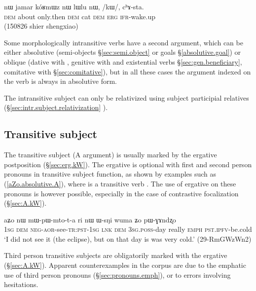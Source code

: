 \begin{exe}
\ex \label{ex:kW.chAsta}
 \gll nɯ jamar kóʁmɯz nɯ lɯlu nɯ, /kɯ/, cʰɤ-sta. \\
 \textsc{dem} about only.then \textsc{dem} cat \textsc{dem} \textsc{erg} \textsc{ifr}-wake.up \\
 \glt (150826 shier shengxiao)
\end{exe}

Some morphologically intransitive verbs have a second argument, which can be either absolutive (semi-objects §\ref{sec:semi.object} or goals §\ref{absolutive.goal}) or oblique (dative with , genitive with  and existential verbs §\ref{sec:gen.beneficiary},  comitative with  §\ref{sec:comitative}), but in all these cases the argument indexed on the verb is always in absolutive form. 

The intransitive subject can only be relativized using subject participial relatives (§\ref{sec:intr.subject.relativization} ).

\subsection{Transitive subject} \label{sec:absolutive.A}
 
The transitive subject (A argument) is usually marked by the ergative postposition  (§\ref{sec:erg.kW}). The ergative is optional with first and second person pronouns in transitive subject function, as shown by examples such as (\ref{aZo.absolutive.A}), where  is a transitive verb . The use of ergative on these pronouns is however possible, especially in the case of contrastive focalization (§\ref{sec:A.kW}).


\begin{exe}
\ex \label{aZo.absolutive.A}
 \gll aʑo nɯ mɯ-pɯ-mto-t-a ri nɯ ɯ-sŋi wuma ʑo pɯ-ɣɤndʐo \\
\textsc{1sg} \textsc{dem} \textsc{neg}-\textsc{aor}-see-\textsc{tr}:\textsc{pst}-\textsc{1sg} \textsc{lnk} \textsc{dem} \textsc{3sg}.\textsc{poss}-day really \textsc{emph} \textsc{pst}.\textsc{ipfv}-be.cold  \\
 \glt `I did not see it (the eclipse), but on that day is was very cold.' (29-RmGWzWn2)
\end{exe}

Third person transitive subjects are obligatorily marked with the ergative  (§\ref{sec:A.kW}). Apparent counterexamples in the corpus are due to the emphatic use of third person pronouns (§\ref{sec:pronouns.emph}), or to errors involving hesitations.

